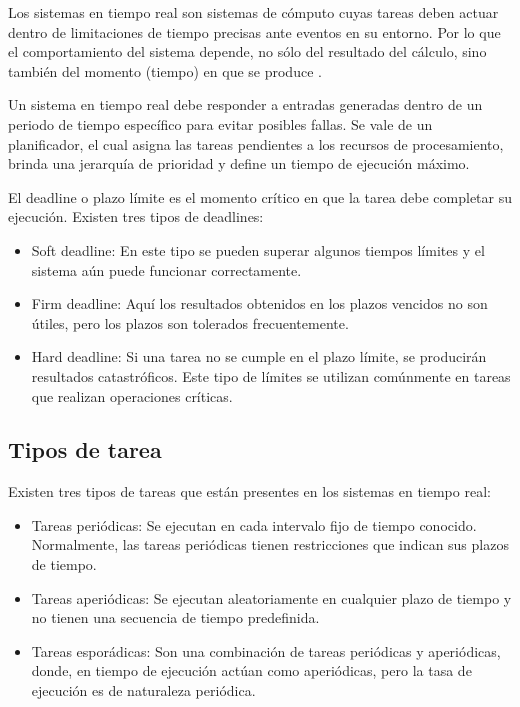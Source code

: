     Los sistemas en tiempo real son sistemas de cómputo cuyas tareas deben actuar dentro de limitaciones de tiempo precisas ante eventos en su entorno. Por lo que el comportamiento del sistema depende, no sólo del resultado del cálculo, sino también del momento (tiempo) en que se produce \cite{Buta2011}. 
    \newline 
    
    Un sistema en tiempo real debe  responder a entradas generadas dentro de un periodo de tiempo específico para evitar posibles fallas. Se vale de un planificador, el cual asigna las tareas pendientes a los recursos de procesamiento, brinda una jerarquía de prioridad y define un tiempo de ejecución máximo.
    \newline
    
    El deadline o plazo límite es el momento crítico en que la tarea debe completar su ejecución. Existen tres tipos de deadlines: 
\begin{itemize}
\item Soft deadline: En este tipo se pueden superar algunos tiempos límites y el sistema aún puede funcionar correctamente.
\item Firm deadline: Aquí los resultados obtenidos en los plazos vencidos no son útiles, pero los plazos son tolerados frecuentemente.
\item Hard deadline: Si una tarea no se cumple en el plazo límite, se producirán resultados catastróficos. Este tipo de límites se utilizan comúnmente en tareas que realizan operaciones críticas.
\end{itemize}   

\subsection{Tipos de tarea}

Existen tres tipos de tareas que están presentes en los sistemas en tiempo real:

\begin{itemize}
\item Tareas periódicas: Se ejecutan en cada intervalo fijo de tiempo conocido. Normalmente, las tareas periódicas tienen restricciones que indican sus plazos de tiempo.
\item Tareas aperiódicas: Se ejecutan aleatoriamente en cualquier plazo de tiempo y no tienen una secuencia de tiempo predefinida.
\item Tareas esporádicas: Son una combinación de tareas periódicas y aperiódicas, donde, en tiempo de ejecución actúan como aperiódicas, pero la tasa de ejecución es de naturaleza periódica.
\end{itemize}  

